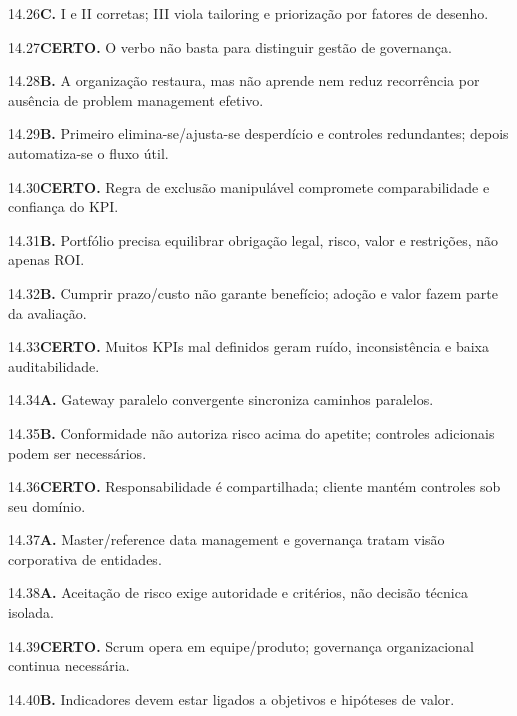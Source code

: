 \begin{solucao}{14.26}\textbf{C.} I e II corretas; III viola tailoring e priorização por fatores de desenho.\end{solucao}
\begin{solucao}{14.27}\textbf{CERTO.} O verbo não basta para distinguir gestão de governança.\end{solucao}
\begin{solucao}{14.28}\textbf{B.} A organização restaura, mas não aprende nem reduz recorrência por ausência de problem management efetivo.\end{solucao}
\begin{solucao}{14.29}\textbf{B.} Primeiro elimina-se/ajusta-se desperdício e controles redundantes; depois automatiza-se o fluxo útil.\end{solucao}
\begin{solucao}{14.30}\textbf{CERTO.} Regra de exclusão manipulável compromete comparabilidade e confiança do KPI.\end{solucao}
\begin{solucao}{14.31}\textbf{B.} Portfólio precisa equilibrar obrigação legal, risco, valor e restrições, não apenas ROI.\end{solucao}
\begin{solucao}{14.32}\textbf{B.} Cumprir prazo/custo não garante benefício; adoção e valor fazem parte da avaliação.\end{solucao}
\begin{solucao}{14.33}\textbf{CERTO.} Muitos KPIs mal definidos geram ruído, inconsistência e baixa auditabilidade.\end{solucao}
\begin{solucao}{14.34}\textbf{A.} Gateway paralelo convergente sincroniza caminhos paralelos.\end{solucao}
\begin{solucao}{14.35}\textbf{B.} Conformidade não autoriza risco acima do apetite; controles adicionais podem ser necessários.\end{solucao}
\begin{solucao}{14.36}\textbf{CERTO.} Responsabilidade é compartilhada; cliente mantém controles sob seu domínio.\end{solucao}
\begin{solucao}{14.37}\textbf{A.} Master/reference data management e governança tratam visão corporativa de entidades.\end{solucao}
\begin{solucao}{14.38}\textbf{A.} Aceitação de risco exige autoridade e critérios, não decisão técnica isolada.\end{solucao}
\begin{solucao}{14.39}\textbf{CERTO.} Scrum opera em equipe/produto; governança organizacional continua necessária.\end{solucao}
\begin{solucao}{14.40}\textbf{B.} Indicadores devem estar ligados a objetivos e hipóteses de valor.\end{solucao}

